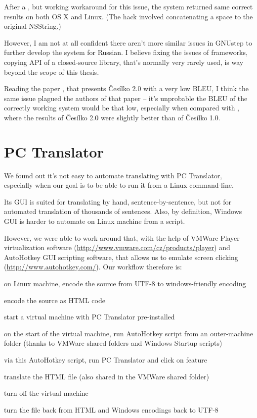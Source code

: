 After a , but working workaround for this issue, the system returned same correct results on both OS X and Linux. (The hack involved concatenating a space to the original NSString.) 

However, I am not at all confident there aren't more similar issues in GNUstep to further develop the system for Russian.
I believe fixing the issues of frameworks, copying API of a closed-source library, that's normally very rarely used, is way beyond the scope of this thesis.


Reading the paper \cite{evalquality_cesilko}, that presents Česílko 2.0 with a very low BLEU, I think the same issue plagued the authors of that paper -- it's unprobable the BLEU of the correctly working system would be that low, especially when compared with \cite{cesilko2}, where the results of Česílko 2.0 were slightly better than of Česílko 1.0.


\section{PC Translator}
We found out it's not easy to automate translating with PC Translator, especially when our goal is to be able to run it from a Linux command-line.

Its GUI is suited for translating by hand, sentence-by-sentence, but not for automated translation of thousands of sentences. Also, by definition, Windows GUI is harder to automate on Linux machine from a script.

However, we were able to work around that, with the help of VMWare Player virtualization software (\url{http://www.vmware.com/cz/products/player}) and Au\-to\-Hot\-key GUI scripting software, that allows us to emulate screen clicking (\url{http://www.autohotkey.com/}). Our workflow therefore is:

\begin{pitemize}
\item on Linux machine, encode the source from UTF-8 to windows-friendly encoding
\item encode the source as HTML code
\item start a virtual machine with PC Translator pre-installed
\item on the start of the virtual machine, run AutoHotkey script from an outer-machine folder (thanks to VMWare shared folders and Windows Startup scripts)
\item via this AutoHotkey script, run PC Translator and click on  feature 
\item translate the HTML file (also shared in the VMWare shared folder)
\item turn off the virtual machine
\item turn the file back from HTML and Windows encodings back to UTF-8
\end{pitemize}

